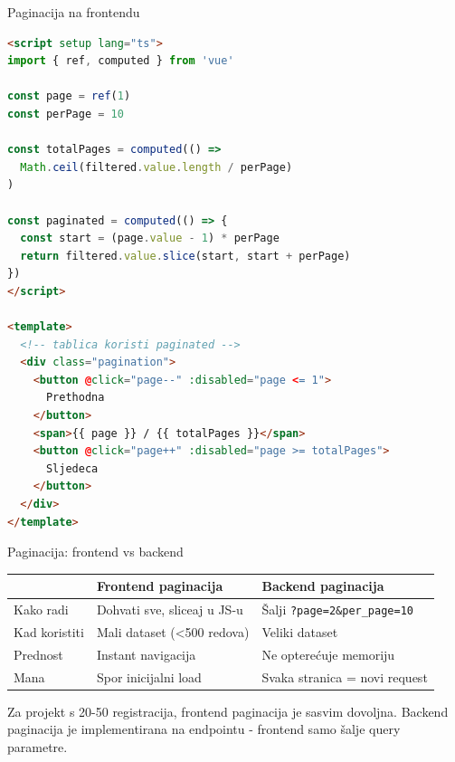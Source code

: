 \begin{frame}[fragile,shrink=5]{Paginacija na frontendu}
\begin{lstlisting}[language=html]
<script setup lang="ts">
import { ref, computed } from 'vue'

const page = ref(1)
const perPage = 10

const totalPages = computed(() =>
  Math.ceil(filtered.value.length / perPage)
)

const paginated = computed(() => {
  const start = (page.value - 1) * perPage
  return filtered.value.slice(start, start + perPage)
})
</script>

<template>
  <!-- tablica koristi paginated -->
  <div class="pagination">
    <button @click="page--" :disabled="page <= 1">
      Prethodna
    </button>
    <span>{{ page }} / {{ totalPages }}</span>
    <button @click="page++" :disabled="page >= totalPages">
      Sljedeca
    </button>
  </div>
</template>
\end{lstlisting}
\end{frame}

\begin{frame}{Paginacija: frontend vs backend}
\begin{tabular}{@{}lp{5cm}p{5cm}@{}}
  \toprule
  & \textbf{Frontend paginacija} & \textbf{Backend paginacija} \\
  \midrule
  Kako radi & Dohvati sve, sliceaj u JS-u & Šalji \texttt{?page=2\&per\_page=10} \\
  Kad koristiti & Mali dataset (<500 redova) & Veliki dataset \\
  Prednost & Instant navigacija & Ne opterećuje memoriju \\
  Mana & Spor inicijalni load & Svaka stranica = novi request \\
  \bottomrule
\end{tabular}

\vspace{0.6em}
Za projekt s 20-50 registracija, frontend paginacija je sasvim dovoljna. Backend paginacija je implementirana na  endpointu - frontend samo šalje query parametre.
\end{frame}

